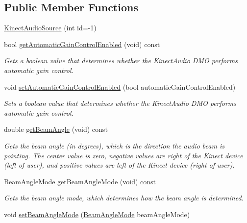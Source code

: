 \subsection*{\-Public \-Member \-Functions}
\begin{DoxyCompactItemize}
\item 
\hyperlink{class_kinect_audio_source_a4164bb2f07a9edaafb141463f18fdd93}{\-Kinect\-Audio\-Source} (int id=-\/1)
\item 
bool \hyperlink{class_kinect_audio_source_a3b56f5ec383bf98b73cf081ef2ee328c}{get\-Automatic\-Gain\-Control\-Enabled} (void) const 
\begin{DoxyCompactList}\small\item\em \-Gets a boolean value that determines whether the \-Kinect\-Audio \-D\-M\-O performs automatic gain control. \end{DoxyCompactList}\item 
void \hyperlink{class_kinect_audio_source_a579ab2b6492a539663d7bc20dbdaf01a}{set\-Automatic\-Gain\-Control\-Enabled} (bool automatic\-Gain\-Control\-Enabled)
\begin{DoxyCompactList}\small\item\em \-Sets a boolean value that determines whether the \-Kinect\-Audio \-D\-M\-O performs automatic gain control. \end{DoxyCompactList}\item 
double \hyperlink{class_kinect_audio_source_a821755eeb016c172031ce1bd450b8db4}{get\-Beam\-Angle} (void) const 
\begin{DoxyCompactList}\small\item\em \-Gets the beam angle (in degrees), which is the direction the audio beam is pointing. \-The center value is zero, negative values are right of the \-Kinect device (left of user), and positive values are left of the \-Kinect device (right of user). \end{DoxyCompactList}\item 
\hyperlink{beam_angle_mode_8h_ac302e9685e72b202866c3bafb6737bc0}{\-Beam\-Angle\-Mode} \hyperlink{class_kinect_audio_source_ab23014ce17cd6fa23b488219d8160cd0}{get\-Beam\-Angle\-Mode} (void) const 
\begin{DoxyCompactList}\small\item\em \-Gets the beam angle mode, which determines how the beam angle is determined. \end{DoxyCompactList}\item 
void \hyperlink{class_kinect_audio_source_a41f088a153be1a46b8a69ed8806b841b}{set\-Beam\-Angle\-Mode} (\hyperlink{beam_angle_mode_8h_ac302e9685e72b202866c3bafb6737bc0}{\-Beam\-Angle\-Mode} beam\-Angle\-Mode)

\end{DoxyCompactItemize}
